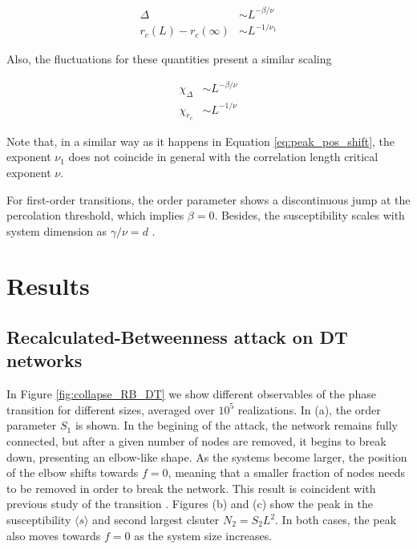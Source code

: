 \documentclass{article}
\begin{document}
\begin{align}
\Delta&\sim L^{-\beta/\nu} \label{eq:fan_Delta}\\
r_c(L) - r_c(\infty) &\sim L^{-1/\nu_1} \label{eq:fan_rc}
\end{align}

Also, the fluctuations for these quantities present a similar scaling 

\begin{align}
\chi_{\Delta} &\sim L^{-\beta/\nu} \label{eq:fan_chiDelta} \\
\chi_{r_c} &\sim L^{-1/\nu} \label{eq:fan_chirc}
\end{align}

Note that, in a similar way as it happens in Equation \ref{eq:peak_pos_shift}, the exponent $\nu_1$ does not coincide in general with the correlation length critical exponent $\nu$.


For first-order transitions, the order parameter shows a discontinuous jump at the percolation threshold, which implies $\beta = 0$. Besides, the susceptibility scales with system dimension as $\gamma / \nu = d$ \cite{Binder1981,Binder1984,Cho2009}.

\section{Results}

\subsection{Recalculated-Betweenness attack on DT networks}

In Figure \ref{fig:collapse_RB_DT} we show different observables of the phase transition for different sizes, averaged over $10^5$ realizations. In (a), the order parameter $S_1$ is shown. In the begining of the attack, the network remains fully connected, but after a given number of nodes are removed, it begins to break down, presenting an elbow-like shape. As the systems become larger, the position of the elbow shifts towards $f = 0$, meaning that a smaller fraction of nodes needs to be removed in order to break the network. This result is coincident with previous study of the transition \cite{Norrenbrock2016FragmentationAttacks}. Figures (b) and (c) show the peak in the susceptibility $\langle s \rangle$ and second largest clsuter $N_2=S_2L^2$. In both cases, the peak also moves towards $f = 0$ as the system size increases. 
\end{document}

